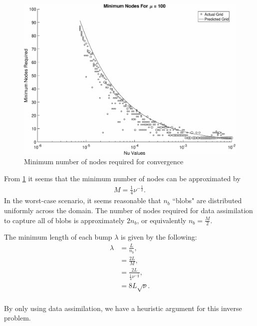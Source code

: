 \documentclass[12pt]{amsart}
\theoremstyle{plain}
\theoremstyle{definition}
\theoremstyle{remark}
\numberwithin{equation}{section} %
\numberwithin{figure}{section}   %
\begin{document}
\begin{figure}
	\centering
	\includegraphics[width = .9\textwidth]{DA_MinimunNodes_grid_mu=100}
	\caption{Minimum number of nodes required for convergence}
	\label{fig:minimungrid}
\end{figure}
From \ref{fig:minimungrid} it seems that the minimum number of nodes can be approximated by
\begin{align*}
M = \frac{1}{4}\nu^{-\frac{1}{2}}.
\end{align*}
In the worst-case scenario, it seems reasonable that $n_b$ ``blobs" are distributed uniformly across the domain. The number of nodes required for data assimilation to capture all of blobs is approximately $2n_b$, or equivalently $n_b = \frac{M}{2}$.

The minimum length of each bump $\lambda$ is given by the following:
\begin{align*}
\lambda &=\frac{L}{n_b},\\
&= \frac{2L}{M},\\
&=\frac{2L}{\frac{1}{4}\nu^{-\frac{1}{2}}},\\
& = 8L\sqrt{\nu}.\\
\end{align*}

By only using data assimilation, we have a heuristic argument for this inverse problem.
\end{document}
